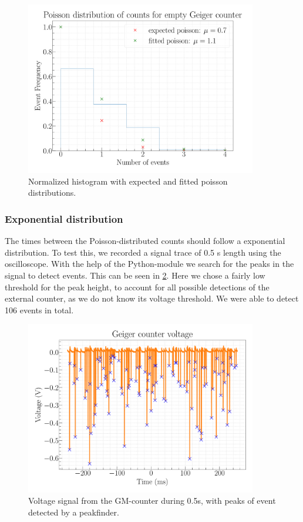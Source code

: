 \begin{figure}[H]
\centering
\includegraphics[width=0.9\textwidth]{../Figures/Geiger_poisson_fit.pdf}
\caption{Normalized histogram with expected and fitted poisson distributions.}
\label{fig:PoissonFit}
\end{figure}

\subsubsection{Exponential distribution}

The times between the Poisson-distributed counts should follow a exponential distribution. To test this, we recorded a signal trace of 0.5 s length using the oscilloscope. With the help of the Python-module  we search for the peaks in the signal to detect events. This can be seen in \cref{fig:peaks}. Here we chose a fairly low threshold for the peak height, to account for all possible detections of the external counter, as we do not know its voltage threshold. We were able to detect 106 events in total.

\begin{figure}[h]
	\centering
	\includegraphics[width=0.9\textwidth]{../Figures/Geiger_peaks_0,5s.pdf}
	\caption{Voltage signal from the GM-counter during 0.5s, with peaks of event detected by a peakfinder.}
	\label{fig:peaks}
\end{figure}

